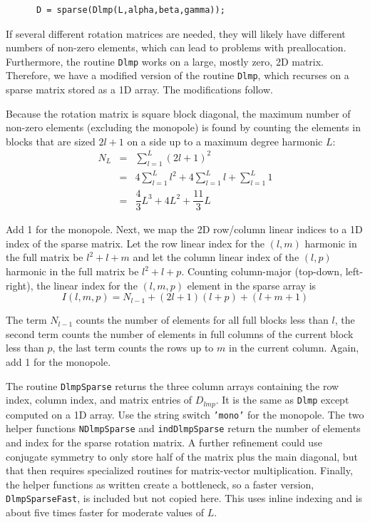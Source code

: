 \begin{verbatim}
      D = sparse(Dlmp(L,alpha,beta,gamma));
\end{verbatim}

If several different rotation matrices are needed, they will likely have different numbers of non-zero elements, which can lead to problems with preallocation. Furthermore, the routine \texttt{Dlmp} works on a large, mostly zero, 2D matrix. Therefore, we have a modified version of the routine \texttt{Dlmp}, which recurses on a sparse matrix stored as a 1D array. The modifications follow.

Because the rotation matrix is square block diagonal, the maximum number of non-zero elements (excluding the monopole) is found by counting the elements in blocks that are sized $2l+1$ on a side up to a maximum degree harmonic $L$: 
\begin{eqnarray}
N_L &=& \sum_{l=1}^L (2l + 1)^2  \\
\ &=& 4 \sum_{l=1}^L l^2 + 4 \sum_{l=1}^L l + \sum_{l=1}^L 1 \\
\ &=& \dfrac{4}{3} L^3 + 4L^2 + \dfrac{11}{3}L 
\end{eqnarray}

Add 1 for the monopole.  Next, we map the 2D row/column linear indices to a 1D index of the sparse matrix. Let the row linear index for the $(l,m)$ harmonic in the full matrix be $l^2 + l + m$ and let the column linear index of the $(l,p)$ harmonic in the full matrix be $l^2 + l + p$.  Counting column-major (top-down, left-right), the linear index for the $(l,m,p)$ element in the sparse array is
\begin{equation}
I(l,m,p) = N_{l-1} + (2l+1)(l+p) + (l+m+1)
\end{equation}

\noindent The term $N_{l-1}$ counts the number of elements for all full blocks less than $l$, the second term counts the number of elements in full columns of the current block less than $p$, the last term counts the rows up to $m$ in the current column.  Again, add 1 for the monopole.  

The routine \texttt{DlmpSparse} returns the three column arrays containing the row index, column index, and matrix entries of $D_{lmp}$. It is the same as \texttt{Dlmp} except computed on a 1D array.  Use the string switch \texttt{'mono'} for the monopole.  The two helper functions \texttt{NDlmpSparse} and \texttt{indDlmpSparse} return the number of elements and index for the sparse rotation matrix. A further refinement could use conjugate symmetry to only store half of the matrix plus the main diagonal, but that then requires specialized routines for matrix-vector multiplication. Finally, the helper functions as written create a bottleneck, so a faster version, \texttt{DlmpSparseFast}, is included but not copied here. This uses inline indexing and is about five times faster for moderate values of $L$. 


